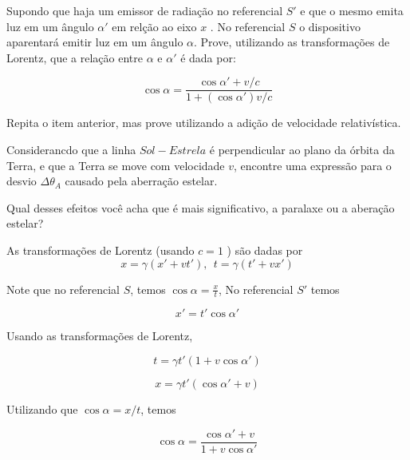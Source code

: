 \documentclass[11pt]{article}
\begin{document}
\begin{pproblem}
\begin{alternativas}
        \item Supondo que haja um emissor de radiação no referencial \(S'\) e que o mesmo emita luz em um ângulo \(\alpha'\) em relção ao eixo \(x\) . No referencial \(S\) o dispositivo aparentará emitir luz em um ângulo \(\alpha\). Prove, utilizando as transformações de Lorentz, que a relação entre \(\alpha\) e \(\alpha'\) é dada por:
        
        \[\cos\alpha = \frac{\cos\alpha' + v/c}{1+(\cos\alpha') v/c}\]

        \item Repita o item anterior, mas prove utilizando a adição de velocidade relativística.

        \item Considerancdo que a linha \(Sol-Estrela\) é perpendicular ao plano da órbita da Terra, e que a Terra se move com velocidade \(v\), encontre uma expressão para o desvio \(\Delta\theta_A\) causado pela aberração estelar.
    
        \item Qual desses efeitos você acha que é mais significativo, a paralaxe ou a aberação estelar?
    \end{alternativas}

    \begin{pssolution*}{}{}
        \begin{alternativas}
            \item %
            
            \item %
                
            \item As transformações de Lorentz (usando \(c=1\) ) são dadas por 
            \[x = \gamma (x' + vt'), \ \ t = \gamma(t' + vx')\]

            \item Note que no referencial \(S\), temos \(\cos \alpha = \frac{x}{t}\), No referencial \(S'\) temos 
            
            \[x' = t'\cos\alpha'\]

            Usando as transformações de Lorentz, 

            \[t = \gamma t'(1+v\cos\alpha') \]

            \[x = \gamma t'(\cos\alpha'+ v)\]

            Utilizando que \(\cos\alpha = x/t\), temos

            \[\cos\alpha = \frac{\cos\alpha' + v}{1+ v\cos\alpha'}\]


\end{alternativas}
\end{pssolution*}
\end{pproblem}
\end{document}
